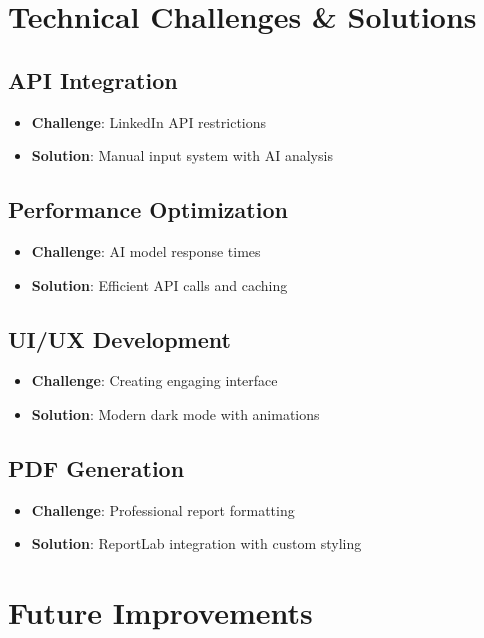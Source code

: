 \documentclass[12pt,a4paper]{article}
\begin{document}
\section{Technical Challenges \& Solutions}

\subsection{API Integration}
\begin{itemize}
    \item \textbf{Challenge}: LinkedIn API restrictions
    \item \textbf{Solution}: Manual input system with AI analysis
\end{itemize}

\subsection{Performance Optimization}
\begin{itemize}
    \item \textbf{Challenge}: AI model response times
    \item \textbf{Solution}: Efficient API calls and caching
\end{itemize}

\subsection{UI/UX Development}
\begin{itemize}
    \item \textbf{Challenge}: Creating engaging interface
    \item \textbf{Solution}: Modern dark mode with animations
\end{itemize}

\subsection{PDF Generation}
\begin{itemize}
    \item \textbf{Challenge}: Professional report formatting
    \item \textbf{Solution}: ReportLab integration with custom styling
\end{itemize}

\section{Future Improvements}
\end{document}
